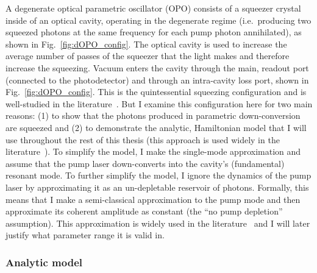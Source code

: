 A degenerate optical parametric oscillator (OPO) consists of a squeezer crystal inside of an optical cavity, operating in the degenerate regime (i.e.\ producing two squeezed photons at the same frequency for each pump photon annihilated), as shown in Fig.~\ref{fig:dOPO_config}. The optical cavity is used to increase the average number of passes of the squeezer that the light makes and therefore increase the squeezing. Vacuum enters the cavity through the main, readout port (connected to the photodetector) and through an intra-cavity loss port, shown in Fig.~\ref{fig:dOPO_config}. This is the quintessential squeezing configuration and is well-studied in the literature~\cite{}. But I examine this configuration here for two main reasons: (1) to show that the photons produced in parametric down-conversion are squeezed and (2) to demonstrate the analytic, Hamiltonian model that I will use throughout the rest of this thesis (this approach is used widely in the literature~\cite{}).  
To simplify the model, I make the single-mode approximation and assume that the pump laser down-converts into the cavity's (fundamental) resonant mode.
To further simplify the model, I ignore the dynamics of the pump laser by approximating it as an un-depletable reservoir of photons. Formally, this means that I make a semi-classical approximation to the pump mode and then approximate its coherent amplitude as constant (the ``no pump depletion'' assumption). This approximation is widely used in the literature~\cite{} and I will later justify what parameter range it is valid in.

\subsubsection{Analytic model}
\label{sec:dOPO_model}

